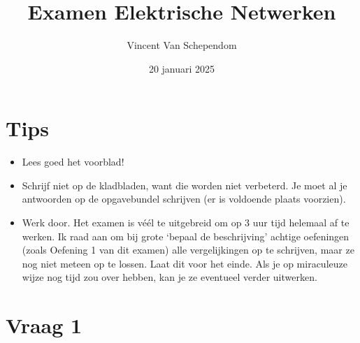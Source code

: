 \documentclass{kuburgiearticle}
\title{Examen Elektrische Netwerken}
\author{Vincent Van Schependom}
\date{20 januari 2025}
\begin{document}
	\maketitle

	\section*{Tips}

	\begin{itemize}
		\item Lees goed het voorblad!
		\item Schrijf niet op de kladbladen, want die worden niet verbeterd. Je moet al je antwoorden op de opgavebundel schrijven (er is voldoende plaats voorzien).
		\item Werk door. Het examen is véél te uitgebreid om op 3 uur tijd helemaal af te werken. Ik raad aan om bij grote `bepaal de beschrijving' achtige oefeningen (zoals Oefening 1 van dit examen) alle vergelijkingen op te schrijven, maar ze nog niet meteen op te lossen. Laat dit voor het einde. Als je op miraculeuze wijze nog tijd zou over hebben, kan je ze eventueel verder uitwerken.
	\end{itemize}

	\section*{Vraag 1}
\end{document}
